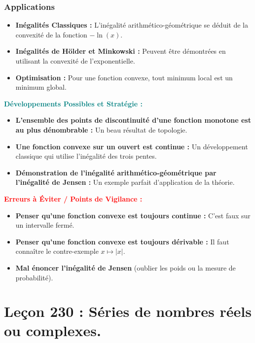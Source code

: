 \documentclass[12pt, a4paper, parskip=full]{report}
\theoremstyle{agregstyle}
\newenvironment{developpements}
  {\par\medskip\noindent\begin{oframed}\noindent\textbf{\textcolor{teal}{Développements Possibles et Stratégie :}}}
  {\end{oframed}\par\medskip}
\newenvironment{erreurs}
  {\par\medskip\noindent\begin{oframed}\noindent\textbf{\textcolor{red}{Erreurs à Éviter / Points de Vigilance :}}}
  {\end{oframed}\par\medskip}
\begin{document}
\subsection{Applications}
\begin{itemize}
    \item \textbf{Inégalités Classiques :} L'inégalité arithmético-géométrique se déduit de la convexité de la fonction $-\ln(x)$.
    \item \textbf{Inégalités de Hölder et Minkowski :} Peuvent être démontrées en utilisant la convexité de l'exponentielle.
    \item \textbf{Optimisation :} Pour une fonction convexe, tout minimum local est un minimum global.
\end{itemize}

\begin{developpements}
    \begin{itemize}
        \item \textbf{L'ensemble des points de discontinuité d'une fonction monotone est au plus dénombrable :} Un beau résultat de topologie.
        \item \textbf{Une fonction convexe sur un ouvert est continue :} Un développement classique qui utilise l'inégalité des trois pentes.
        \item \textbf{Démonstration de l'inégalité arithmético-géométrique par l'inégalité de Jensen :} Un exemple parfait d'application de la théorie.
    \end{itemize}
\end{developpements}

\begin{erreurs}
    \begin{itemize}
        \item \textbf{Penser qu'une fonction convexe est toujours continue :} C'est faux sur un intervalle fermé.
        \item \textbf{Penser qu'une fonction convexe est toujours dérivable :} Il faut connaître le contre-exemple $x \mapsto |x|$.
        \item \textbf{Mal énoncer l'inégalité de Jensen} (oublier les poids ou la mesure de probabilité).
    \end{itemize}
\end{erreurs}

\chapter{Leçon 230 : Séries de nombres réels ou complexes.}
\end{document}
